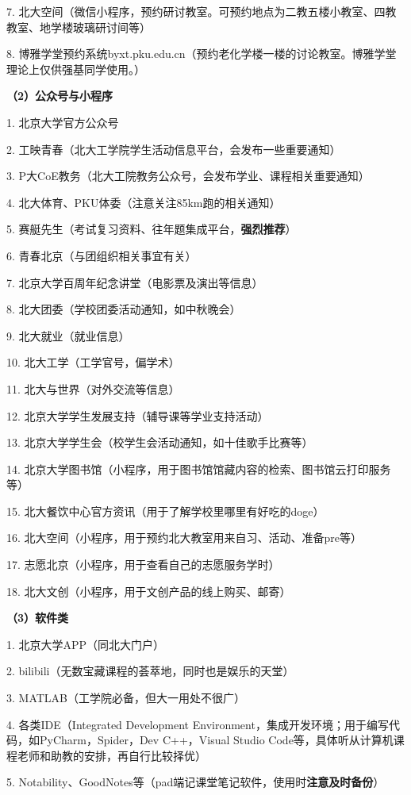 \documentclass[11pt,oneside]{book}
\begin{document}
7. 北大空间（微信小程序，预约研讨教室。可预约地点为二教五楼小教室、四教教室、地学楼玻璃研讨间等）

8. 博雅学堂预约系统byxt.pku.edu.cn（预约老化学楼一楼的讨论教室。博雅学堂理论上仅供强基同学使用。）

\textbf{（2）公众号与小程序}

1. 北京大学官方公众号

2. 工映青春（北大工学院学生活动信息平台，会发布一些重要通知）

3. P大CoE教务（北大工院教务公众号，会发布学业、课程相关重要通知）

4. 北大体育、PKU体委（注意关注85km跑的相关通知）

5. 赛艇先生（考试复习资料、往年题集成平台，\textbf{强烈推荐}）

6. 青春北京（与团组织相关事宜有关）

7. 北京大学百周年纪念讲堂（电影票及演出等信息）

8. 北大团委（学校团委活动通知，如中秋晚会）

9. 北大就业（就业信息）

10. 北大工学（工学官号，偏学术）

11. 北大与世界（对外交流等信息）

12. 北京大学学生发展支持（辅导课等学业支持活动）

13. 北京大学学生会（校学生会活动通知，如十佳歌手比赛等）

14. 北京大学图书馆（小程序，用于图书馆馆藏内容的检索、图书馆云打印服务等）

15. 北大餐饮中心官方资讯（用于了解学校里哪里有好吃的doge）

16. 北大空间（小程序，用于预约北大教室用来自习、活动、准备pre等）

17. 志愿北京（小程序，用于查看自己的志愿服务学时）

18. 北大文创（小程序，用于文创产品的线上购买、邮寄）

\textbf{（3）软件类}

1. 北京大学APP（同北大门户）

2. bilibili（无数宝藏课程的荟萃地，同时也是娱乐的天堂）

3. MATLAB（工学院必备，但大一用处不很广）

4. 各类IDE（Integrated Development Environment，集成开发环境；用于编写代码，如PyCharm，Spider，Dev C++，Visual Studio Code等，具体听从计算机课程老师和助教的安排，再自行比较择优）

5. Notability、GoodNotes等（pad端记课堂笔记软件，使用时\textbf{注意及时备份}）
\end{document}
